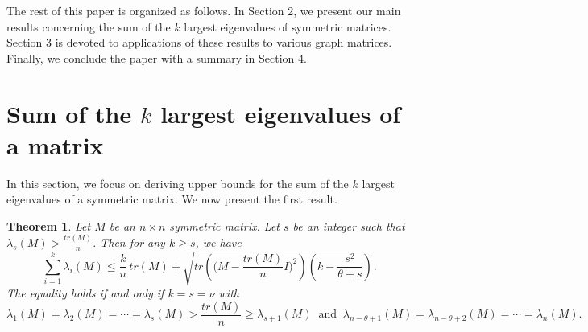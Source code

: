 \documentclass[12pt]{article}
\newtheorem{theorem}{Theorem}[section]
\begin{document}
 The rest of this paper is organized as follows. In Section 2, we
 present our main results concerning the sum of the $k$ largest
 eigenvalues of symmetric matrices. Section 3 is devoted to
 applications of these results to various graph matrices. Finally, we
 conclude the paper with a summary in Section 4.



 \section{Sum of the $k$ largest eigenvalues of a matrix}

In this section, we focus on deriving upper bounds for the sum of the $k$ largest eigenvalues of a symmetric matrix. We now present the first result.

 \begin{theorem} \label{th1} Let $M$ be an $n\times n$ symmetric matrix. Let $s$ be an integer such that $\lambda_s(M)>\frac{tr(M)}{n}$. Then for any $k\geq s$, we have
 \begin{equation}
 \sum_{i=1}^{k}\lambda_i(M)\leq\frac{k}{n}\,tr(M)+\sqrt{tr\left(\Big(M-\frac{tr(M)}{n}I\Big)^2\right)\left(k-\frac{s^2}{\theta+s}\right)}. \label{e1}
 \end{equation}
 The equality holds if and only if  $k=s=\nu$ with 
 $$\lambda_1(M)=\lambda_2(M)=\cdots=\lambda_s(M)>\frac{tr(M)}{n}\geq \lambda_{s+1}(M)~\mbox{ and }~\lambda_{n-\theta+1}(M)=\lambda_{n-\theta+2}(M)=\cdots=\lambda_n(M).$$
 \end{theorem}
\end{document}

